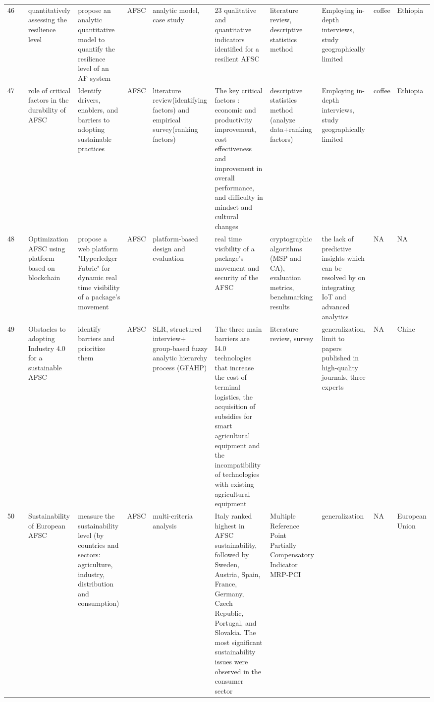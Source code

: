 \documentclass[a4paper,10pt]{article}
\begin{document}
\begin{landscape}
\begin{small}
\begin{longtable}{p{0.5cm} p{2cm} p{2.5cm} p{4cm} p{1cm} p{2.5cm} p{5.5cm} p{2.5cm} p{2.5cm} p{1.8cm} p{1.5cm}}
46 & \textcite{Tebaldi17} &quantitatively assessing the resilience level&propose an analytic quantitative model to quantify the resilience level of an AF system & AFSC & analytic model, case study & 23 qualitative and quantitative indicators identified for a resilient AFSC& literature review, descriptive statistics method   & Employing in-depth interviews, study geographically limited & coffee& Ethiopia \\
47 & \textcite{Habib18} & role of critical factors in the durability of AFSC&Identify drivers, enablers, and barriers to adopting sustainable practices & AFSC & literature review(identifying factors) and empirical survey(ranking factors) & The key critical factors : economic and productivity improvement, cost effectiveness and improvement in overall performance, and difficulty in mindset and cultural changes & descriptive statistics method (analyze data+ranking factors) & Employing in-depth interviews, study geographically limited & coffee& Ethiopia\\
48 &\textcite{ElHajji19} & Optimization AFSC  using platform based on blockchain&propose a web platform "Hyperledger Fabric" for dynamic real time visibility of a package’s movement & AFSC & platform-based design and evaluation &  real time visibility of a package’s movement and security of the AFSC & cryptographic algorithms (MSP and CA), evaluation metrics, benchmarking results & the lack of predictive insights which can be resolved by on integrating  IoT  and advanced analytics& NA& NA \\
49 & \textcite{zhao20}& Obstacles to adopting Industry 4.0 for a sustainable AFSC&identify barriers and prioritize them & AFSC &SLR,  structured interview+ group-based fuzzy analytic hierarchy process (GFAHP)& The three main barriers are I4.0 technologies that increase the cost of terminal logistics, the acquisition of subsidies for smart agricultural equipment and the incompatibility of technologies with existing agricultural equipment&   literature review, survey &  generalization, limit to papers published in high-quality journals, three experts& NA& Chine\\
50 & \textcite{ricciolini22} &Sustainability of European AFSC& measure the sustainability  level (by countries and sectors: agriculture, industry, distribution and consumption) & AFSC & multi-criteria analysis &Italy ranked highest in AFSC sustainability, followed by Sweden, Austria, Spain, France, Germany, Czech Republic, Portugal, and Slovakia. The most significant sustainability issues were observed in the consumer sector& Multiple Reference Point Partially Compensatory Indicator MRP‑PCI & generalization& NA& European Union  \\

\end{longtable}
\end{small}
\end{landscape}
\end{document}
